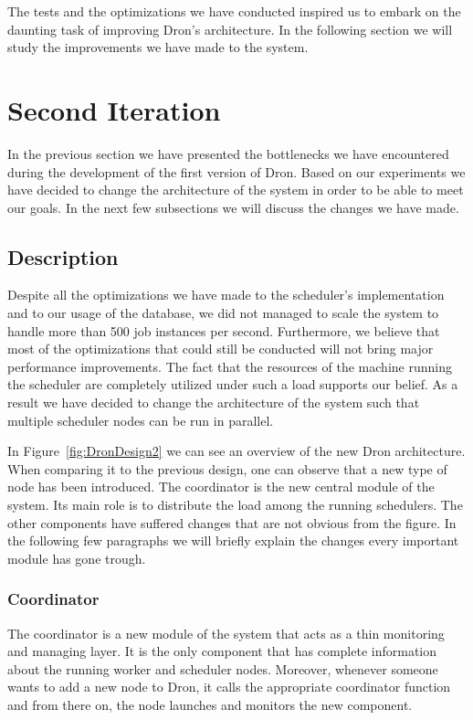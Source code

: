\documentclass[11pt,a4paper,twoside]{report}
\begin{document}
The tests and the optimizations we have conducted inspired us to embark on the daunting task of improving Dron's architecture. In the following section we will study the improvements we have made to the system. 

\section{Second Iteration}
In the previous section we have presented the bottlenecks we have encountered during the development of the first version of Dron. Based on our experiments we have decided to change the architecture of the system in order to be able to meet our goals. In the next few subsections we will discuss the changes we have made.

\subsection{Description}
Despite all the optimizations we have made to the scheduler's implementation and to our usage of the database, we did not managed to scale the system to handle more than 500 job instances per second. Furthermore, we believe that most of the optimizations that could still be conducted will not bring major performance improvements. The fact that the resources of the machine running the scheduler are completely utilized under such a load supports our belief. As a result we have decided to change the architecture of the system such that multiple scheduler nodes can be run in parallel.


In Figure~\ref{fig:DronDesign2} we can see an overview of the new Dron architecture. When comparing it to the previous design, one can observe that a new type of node has been introduced. The coordinator is the new central module of the system. Its main role is to distribute the load among the running schedulers. The other components have suffered changes that are not obvious from the figure. In the following few paragraphs we will briefly explain the changes every important module has gone trough.

\subsubsection{Coordinator}
The coordinator is a new module of the system that acts as a thin monitoring and managing layer. It is the only component that has complete information about the running worker and scheduler nodes. Moreover, whenever someone wants to add a new node to Dron, it calls the appropriate coordinator function and from there on, the node launches and monitors the new component.
\end{document}
